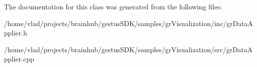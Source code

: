 The documentation for this class was generated from the following files\+:\begin{DoxyCompactItemize}
\item 
/home/vlad/projects/brainhub/gestus\+S\+D\+K/samples/gr\+Visualization/inc/gr\+Data\+Applier.\+h\item 
/home/vlad/projects/brainhub/gestus\+S\+D\+K/samples/gr\+Visualization/src/gr\+Data\+Applier.\+cpp\end{DoxyCompactItemize}
